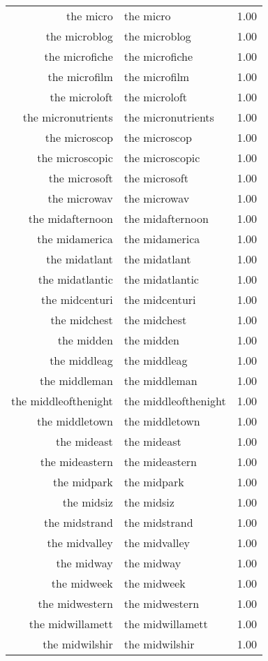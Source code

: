 \begin{table}[ht]
\begin{tabular}{rlr}
  the micro & the micro & 1.00 \\ 
  the microblog & the microblog & 1.00 \\ 
  the microfiche & the microfiche & 1.00 \\ 
  the microfilm & the microfilm & 1.00 \\ 
  the microloft & the microloft & 1.00 \\ 
  the micronutrients & the micronutrients & 1.00 \\ 
  the microscop & the microscop & 1.00 \\ 
  the microscopic & the microscopic & 1.00 \\ 
  the microsoft & the microsoft & 1.00 \\ 
  the microwav & the microwav & 1.00 \\ 
  the midafternoon & the midafternoon & 1.00 \\ 
  the midamerica & the midamerica & 1.00 \\ 
  the midatlant & the midatlant & 1.00 \\ 
  the midatlantic & the midatlantic & 1.00 \\ 
  the midcenturi & the midcenturi & 1.00 \\ 
  the midchest & the midchest & 1.00 \\ 
  the midden & the midden & 1.00 \\ 
  the middleag & the middleag & 1.00 \\ 
  the middleman & the middleman & 1.00 \\ 
  the middleofthenight & the middleofthenight & 1.00 \\ 
  the middletown & the middletown & 1.00 \\ 
  the mideast & the mideast & 1.00 \\ 
  the mideastern & the mideastern & 1.00 \\ 
  the midpark & the midpark & 1.00 \\ 
  the midsiz & the midsiz & 1.00 \\ 
  the midstrand & the midstrand & 1.00 \\ 
  the midvalley & the midvalley & 1.00 \\ 
  the midway & the midway & 1.00 \\ 
  the midweek & the midweek & 1.00 \\ 
  the midwestern & the midwestern & 1.00 \\ 
  the midwillamett & the midwillamett & 1.00 \\ 
  the midwilshir & the midwilshir & 1.00 \\ 

\end{tabular}
\end{table}
